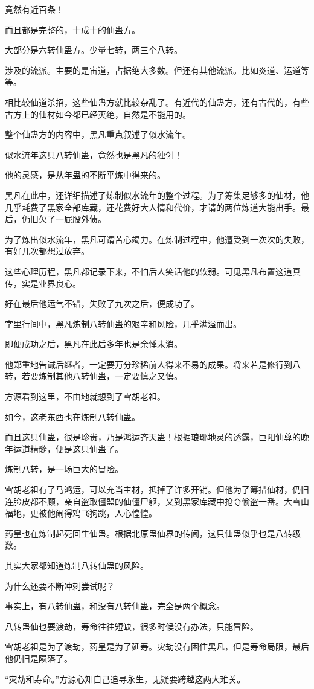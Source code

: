 \begin{this_body}
竟然有近百条！

而且都是完整的，十成十的仙蛊方。

大部分是六转仙蛊方。少量七转，两三个八转。

涉及的流派。主要的是宙道，占据绝大多数。但还有其他流派。比如炎道、运道等等。

相比较仙道杀招，这些仙蛊方就比较杂乱了。有近代的仙蛊方，还有古代的，有些古方上的仙材如今都已经灭绝，自然是不能用的。

整个仙蛊方的内容中，黑凡重点叙述了似水流年。

似水流年这只八转仙蛊，竟然也是黑凡的独创！

他的灵感，是从年蛊的不断平炼中得来的。

黑凡在此中，还详细描述了炼制似水流年的整个过程。为了筹集足够多的仙材，他几乎耗费了黑家全部库藏，还花费好大人情和代价，才请的两位炼道大能出手。最后，仍旧欠了一屁股外债。

为了炼出似水流年，黑凡可谓苦心竭力。在炼制过程中，他遭受到一次次的失败，有好几次都想过放弃。

这些心理历程，黑凡都记录下来，不怕后人笑话他的软弱。可见黑凡布置这道真传，实是业界良心。

好在最后他运气不错，失败了九次之后，便成功了。

字里行间中，黑凡炼制八转仙蛊的艰辛和风险，几乎满溢而出。

即便成功之后，黑凡在此后多年也是余悸未消。

他郑重地告诫后继者，一定要万分珍稀前人得来不易的成果。将来若是修行到八转，若要炼制其他八转仙蛊，一定要慎之又慎。

方源看到这里，不由地就想到了雪胡老祖。

如今，这老东西也在炼制八转仙蛊。

而且这只仙蛊，很是珍贵，乃是鸿运齐天蛊！根据琅琊地灵的透露，巨阳仙尊的晚年运道精髓，便是这只仙蛊了。

炼制八转，是一场巨大的冒险。

雪胡老祖有了马鸿运，可以充当主材，抵掉了许多开销。但他为了筹措仙材，仍旧连脸皮都不顾，亲自盗取僵盟的仙僵尸躯，又到黑家库藏中抢夺偷盗一番。大雪山福地，更被他闹得鸡飞狗跳，人心惶惶。

药皇也在炼制起死回生仙蛊。根据北原蛊仙界的传闻，这只仙蛊似乎也是八转级数。

其实大家都知道炼制八转仙蛊的风险。

为什么还要不断冲刺尝试呢？

事实上，有八转仙蛊，和没有八转仙蛊，完全是两个概念。

八转蛊仙也要渡劫，寿命往往短缺，很多时候没有办法，只能冒险。

雪胡老祖是为了渡劫，药皇是为了延寿。灾劫没有困住黑凡，但是寿命局限，最后他仍旧是陨落了。

“灾劫和寿命。”方源心知自己追寻永生，无疑要跨越这两大难关。

\end{this_body}

